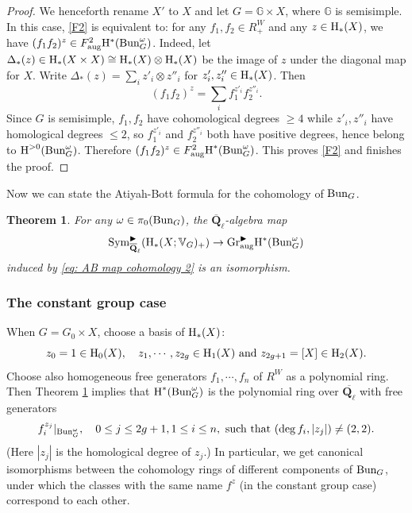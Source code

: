 \documentclass[reqno]{amsart}
\numberwithin{equation}{subsection}
\newtheorem{theorem}[subsubsection]{Theorem}
\theoremstyle{definition}
\def\GG{\mathbb{G}}
\def\VV{\mathbb{V}}
\newcommand{\Bun}{\textup{Bun}}
\newcommand{\Gr}{\textup{Gr}}
\newcommand\Sym{\textup{Sym}}
\newcommand{\Ql}{\Q_{\ell}}
\newcommand{\Qlbar}{\overline{\Q}_\ell}
\newcommand\ot{\otimes}
\newcommand{\homog}[2]{\textup{H}_{#1}({#2})}  %
\newcommand{\cohog}[2]{\textup{H}^{#1}({#2})}     %
\newcommand\D\Delta
\newcommand{\om}{\omega}
\newcommand\aug{\textup{aug}}
\newcommand\bl{\blacktriangleright}
\newcommand{\Q}{\mathbf{Q}}
\newcommand{\ol}[1]{\overline{#1}}
\newcommand{\rH}{\ensuremath{\mathrm{H}}\xspace}
\begin{document}
\begin{proof}
We henceforth rename $X'$ to $X$ and let $G=\GG\times X$, where $\GG$ is semisimple. In this case, \eqref{F2} is equivalent to: for any $f_{1}, f_{2}\in R^{W}_{+}$ and  any $z\in \homog{*}{X}$, we have $(f_{1}f_{2})^{z}\in F^{2}_{\aug}\rH^{*}(\Bun_G^\omega)$. Indeed, let $\D_{*}(z)\in \homog{*}{X\times X}\cong \homog{*}{X}\ot \homog{*}{X}$ be the image of $z$ under the diagonal map for $X$. Write $\D_{*}(z)=\sum_{i} z'_{i}\ot z''_{i}$ for $z'_{i}, z''_{i}\in \homog{*}{X}$. Then
\begin{equation}\label{contraction f1f2}
(f_{1}f_{2})^{z}=\sum_{i}f_{1}^{z'_{i}}f_{2}^{z''_{i}}.
\end{equation}
Since $G$ is semisimple, $f_{1},f_{2}$ have cohomological degrees $\ge4$ while  $z'_{i},z''_{i}$ have homological degrees $\le 2$, so $f_{1}^{z'_{i}}$ and $f_{2}^{z''_{i}}$ both have positive degrees, hence belong to $\cohog{>0}{\Bun_{G}^{\om}}$. Therefore $(f_{1}f_{2})^{z}\in F^{2}_{\aug}\cohog{*}{\Bun_{G}^{\om}}$. This proves \eqref{F2} and finishes the proof.
\end{proof}



Now we can state the Atiyah-Bott formula for the cohomology of $\Bun_{G}$.

\begin{theorem}\label{thm: atiyah-bott formula}
For any $\om\in \pi_{0}(\Bun_{G})$, the $\Qlbar$-algebra map
\begin{equation}\label{eq: atiyah-bott formula}
\Sym_{\Qlbar}^{\bl} (\rH_*(X; \VV_G)_+) \rightarrow \Gr^{\bl}_{\aug} \rH^*(\Bun_G^\omega)
\end{equation}
induced by \eqref{eq: AB map cohomology 2} is an isomorphism.  
\end{theorem}


\subsubsection{The constant group case}\label{sss:concrete AB} When $G=G_{0}\times X$, choose a basis of $\homog{*}{X}$:
\begin{equation*}
z_{0}=1\in \homog{0}{X}, \quad z_{1},\cdots,z_{2g}\in \homog{1}{X} \mbox{ and } z_{2g+1}=[X]\in \homog{2}{X}.
\end{equation*}
Choose also homogeneous free generators $f_{1},\cdots, f_{n}$ of $R^{W}$ as a polynomial ring. Then Theorem \ref{thm: atiyah-bott formula} implies that $\cohog{*}{\Bun_{G}^{\om}}$ is the polynomial ring over $\ol \Ql$ with free generators
\begin{equation}\label{eq:constant-AB-generators}
f_{i}^{z_{j}}|_{\Bun_{G}^{\om}}, \quad 0\le j\le 2g+1, 1\le i\le n, \mbox{ such that $(\deg f_{i},|z_{j}|)\ne (2,2)$.}
\end{equation}
(Here $|z_j|$ is the homological degree of $z_j$.) In particular, we get canonical isomorphisms between the cohomology rings of different components of $\Bun_{G}$, under which the classes with the same name $f^{z}$ (in the constant group case) correspond to each other. 
\end{document}
